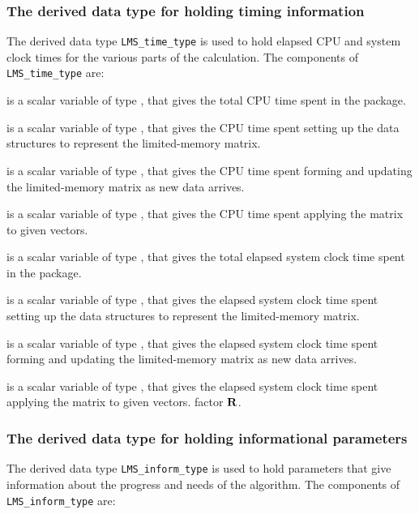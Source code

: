 \documentclass{galahad}
\newcommand{\packagename}{LMS}
\begin{document}
\subsubsection{The derived data type for holding timing
 information}\label{typetime}
The derived data type
{\tt \packagename\_time\_type}
is used to hold elapsed CPU and system clock times for the various parts of
the calculation. The components of
{\tt \packagename\_time\_type}
are:
\begin{description}
 is a scalar variable of type \realdp, that gives
 the total CPU time spent in the package.

 is a scalar variable of type \realdp, that gives
 the CPU time spent setting up the data structures to represent
 the limited-memory matrix.

 is a scalar variable of type \realdp, that gives
 the CPU time spent forming and updating the limited-memory matrix
as new data arrives.

 is a scalar variable of type \realdp, that gives
 the CPU time spent applying the matrix to given vectors.

 is a scalar variable of type \realdp, that gives
 the total elapsed system clock time spent in the package.

 is a scalar variable of type \realdp, that gives
 the elapsed system clock time spent setting up the data structures to
 represent the limited-memory matrix.

 is a scalar variable of type \realdp, that gives
 the elapsed system clock time spent forming and updating the limited-memory
 matrix as new data arrives.

 is a scalar variable of type \realdp, that gives
 the elapsed system clock time spent  applying the matrix to given vectors.
factor ${\mathbf{R}}$.

\end{description}


\subsubsection{The derived data type for holding informational
 parameters}\label{typeinform}
The derived data type
{\tt \packagename\_inform\_type}
is used to hold parameters that give information about the progress and needs
of the algorithm. The components of
{\tt \packagename\_inform\_type}
are:
\end{document}
